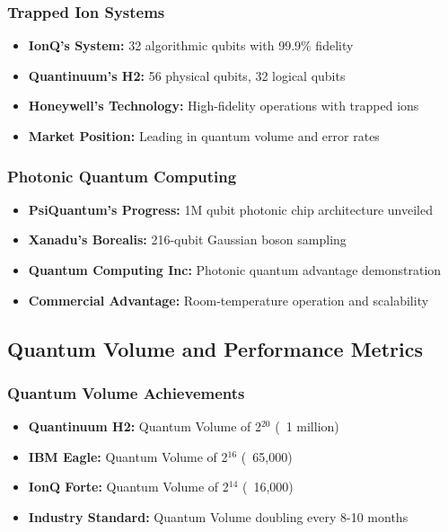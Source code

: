 \documentclass[12pt,a4paper]{article}
\begin{document}
\subsubsection{Trapped Ion Systems}
\begin{itemize}
    \item \textbf{IonQ's System:} 32 algorithmic qubits with 99.9\% fidelity
    \item \textbf{Quantinuum's H2:} 56 physical qubits, 32 logical qubits
    \item \textbf{Honeywell's Technology:} High-fidelity operations with trapped ions
    \item \textbf{Market Position:} Leading in quantum volume and error rates
\end{itemize}

\subsubsection{Photonic Quantum Computing}
\begin{itemize}
    \item \textbf{PsiQuantum's Progress:} 1M qubit photonic chip architecture unveiled
    \item \textbf{Xanadu's Borealis:} 216-qubit Gaussian boson sampling
    \item \textbf{Quantum Computing Inc:} Photonic quantum advantage demonstration
    \item \textbf{Commercial Advantage:} Room-temperature operation and scalability
\end{itemize}

\subsection{Quantum Volume and Performance Metrics}

\subsubsection{Quantum Volume Achievements}
\begin{itemize}
    \item \textbf{Quantinuum H2:} Quantum Volume of 2$^{20}$ (~1 million)
    \item \textbf{IBM Eagle:} Quantum Volume of 2$^{16}$ (~65,000)
    \item \textbf{IonQ Forte:} Quantum Volume of 2$^{14}$ (~16,000)
    \item \textbf{Industry Standard:} Quantum Volume doubling every 8-10 months
\end{itemize}
\end{document}
